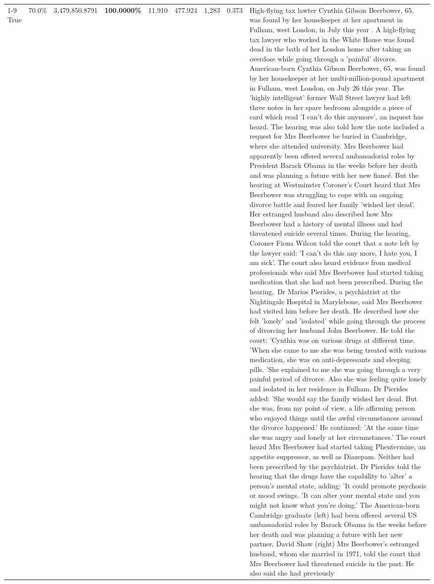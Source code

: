 \begin{table}[H]
\begin{tabular}{lllrlllll}
\cline{1-9}
True & 70.0\% & 3,479,850.8791 & \bfseries \color{red} 100.0000\% & 11.910 & 477.924 & 1,283 & 0.373 & High-flying tax lawter Cynthia Gibson Beerbower, 65, was found by her housekeeper at her apartment in Fulham, west London, in July this year . A high-flying tax lawyer who worked in the White House was found dead in the bath of her London home after taking an overdose while going through a 'painful' divorce. American-born Cynthia Gibson Beerbower, 65, was found by her housekeeper at her multi-million-pound apartment in Fulham, west London, on July 26 this year. The 'highly intelligent' former Wall Street lawyer had left three notes in her spare bedroom alongside a piece of card which read 'I can't do this anymore', an inquest has heard. The hearing was also told how the note included a request for Mrs Beerbower be buried in Cambridge, where she attended university. Mrs Beerbower had apparently been offered several ambassadorial roles by President Barack Obama in the weeks before her death and was planning a future with her new fiancé. But the hearing at Westminster Coroner's Court heard that Mrs Beerbower was struggling to cope with an ongoing divorce battle and feared her family 'wished her dead'. Her estranged husband also described how Mrs Beerbower had a history of mental illness and had threatened suicide several times. During the hearing, Coroner Fiona Wilcox told the court that a note left by the lawyer said: 'I can't do this any more, I hate you, I am sick'. The court also heard evidence from medical professionals who said Mrs Beerbower had started taking medication that she had not been prescribed. During the hearing, Dr Marios Pierides, a psychiatrist at the Nightingale Hospital in Marylebone, said Mrs Beerbower had visited him before her death. He described how she felt 'lonely' and 'isolated' while going through the process of divorcing her husband John Beerbower. He told the court: 'Cynthia was on various drugs at different time. 'When she came to me she was being treated with various medication, she was on anti-depressants and sleeping pills. 'She explained to me she was going through a very painful period of divorce. Also she was feeling quite lonely and isolated in her residence in Fulham. Dr Pierides added: 'She would say the family wished her dead. But she was, from my point of view, a life affirming person who enjoyed things until the awful circumstances around the divorce happened.' He continued: 'At the same time she was angry and lonely at her circumstances.' The court heard Mrs Beerbower had started taking Phentermine, an appetite suppressor, as well as Diazepam. Neither had been prescribed by the psychiatrist. Dr Pierides told the hearing that the drugs have the capability to 'alter' a person's mental state, adding: 'It could promote psychosis or mood swings. 'It can alter your mental state and you might not know what you're doing.' The American-born Cambridge graduate (left) had been offered several US ambassadorial roles by Barack Obama in the weeks before her death and was planning a future with her new partner, David Shaw (right) Mrs Beerbower's estranged husband, whom she married in 1971, told the court that Mrs Beerbower had threatened suicide in the past. He also said she had previously 
\end{tabular}
\end{table}
